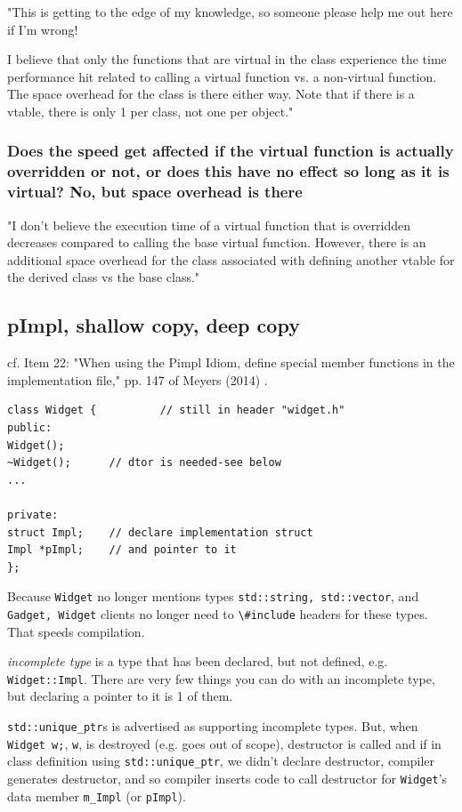 \documentclass[10pt]{amsart}
\begin{document}
"This is getting to the edge of my knowledge, so someone please help me out here if I'm wrong!

I believe that only the functions that are virtual in the class experience the time performance hit related to calling a virtual function vs. a non-virtual function. The space overhead for the class is there either way. Note that if there is a vtable, there is only 1 per class, not one per object."

\subsubsection{Does the speed get affected if the virtual function is actually overridden or not, or does this have no effect so long as it is virtual?  No, but space overhead is there}  

"I don't believe the execution time of a virtual function that is overridden decreases compared to calling the base virtual function. However, there is an additional space overhead for the class associated with defining another vtable for the derived class vs the base class."  

\subsection{pImpl, shallow copy, deep copy}  

cf. Item 22: "When using the Pimpl Idiom, define special member functions in the implementation file," pp. 147 of Meyers (2014) \cite{ScMe2014}.  

\begin{lstlisting}
class Widget { 			// still in header "widget.h" 
public:
Widget();
~Widget();		// dtor is needed-see below 
... 

private:
struct Impl;	// declare implementation struct 
Impl *pImpl;	// and pointer to it
};
\end{lstlisting}

Because \verb|Widget| no longer mentions types \verb|std::string, std::vector|, and \verb|Gadget, Widget| clients no longer need to \verb|\#include| headers for these types.  That speeds compilation.  

\emph{incomplete type} is a type that has been declared, but not defined, e.g. \verb|Widget::Impl|.  There are very few things you can do with an incomplete type, but declaring a pointer to it is 1 of them.  

\verb|std::unique_ptr|s is advertised as supporting incomplete types.  But, when \verb|Widget w;|, \verb|w|, is destroyed (e.g. goes out of scope), destructor is called and if in class definition using \verb|std::unique_ptr|, we didn't declare destructor, compiler generates destructor, and so compiler inserts code to call destructor for \verb|Widget|'s data member \verb|m_Impl| (or \verb|pImpl|).  
\end{document}
